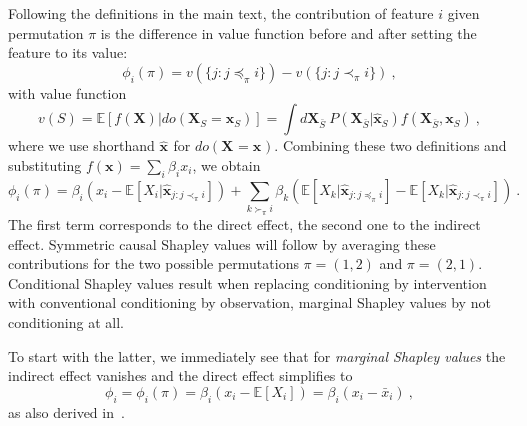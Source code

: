 \documentclass{article}
\newcommand{\vX}{\mathbf{X}}
\newcommand{\vx}{\mathbf{x}}
\newcommand{\expectation}{\mathbb{E}}
\newcommand{\contribution}{{\phi}}
\newcommand{\val}{{v}}
\newcommand{\dodo}{\mathit{do}}
\newcommand{\lvdo}[1]{\dodo(\vX_{#1} = \vx_{#1})}
\newcommand{\svdo}[1]{\hat{\vx}_{#1}}
\newcommand{\perm}{\pi}
\newcommand{\bx}{\bar{x}}
\begin{document}
Following the definitions in the main text, the contribution of feature $i$ given permutation $\perm$ is the difference in value function before and after setting the feature to its value:
\begin{equation}
\contribution_i(\perm) = \val(\{j: j \preceq_\perm i\}) - \val(\{j: j \prec_\perm i\}) \: ,
\label{eq:contperm}
\end{equation}
with value function
\begin{equation}
\val(S) = \expectation \left[f(\vX) | \lvdo{S} \right] = \int d\vX_{\bar{S}} \: P(\vX_{\bar{S}}|\svdo{S}) f(\vX_{\bar{S}},\vx_S) \: ,
\label{eq:valuedef}
\end{equation}
where we use shorthand $\svdo{}$ for $\lvdo{}$. Combining these two definitions and substituting $f(\vx) = \sum_i \beta_i x_i$, we obtain
\[
\contribution_i(\perm) =
\beta_i \left(x_i - \expectation [X_i | \svdo{j: j \prec_\perm i}]\right) + \sum_{k \succ_\perm i} \beta_k \left( \expectation [X_k | \svdo{j: j \preceq_\perm i}] - \expectation [X_k | \svdo{j: j \prec_\perm i}] \right) \: .
\]
The first term corresponds to the direct effect, the second one to the indirect effect. Symmetric causal Shapley values will follow by averaging these contributions for the two possible permutations $\perm = (1,2)$ and $\perm = (2,1)$. Conditional Shapley values result when replacing conditioning by intervention with conventional conditioning by observation, marginal Shapley values by not conditioning at all.

To start with the latter, we immediately see that for {\em marginal Shapley values} the indirect effect vanishes and the direct effect simplifies to
\[
\phi_i = \phi_i(\perm) = \beta_i (x_i - \expectation[X_i])  = \beta_i (x_i - \bx_i) \: ,
\]
as also derived in~\cite{aas2019explaining}.
\end{document}
